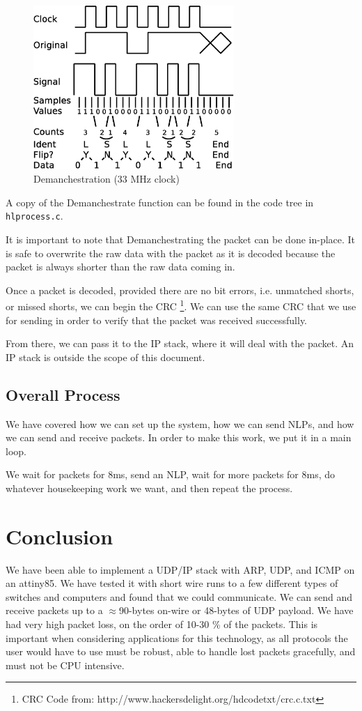 \documentclass[13pt]{ltxdoc}
\begin{document}
\begin{figure}
    \label{demanchester}
    \centering
    \includegraphics[width=3.0in]{demanchester}
    \caption{Demanchestration (33 MHz clock)}
\end{figure}

A copy of the Demanchestrate function can be found in the code tree in \texttt{hlprocess.c}.

It is important to note that Demanchestrating the packet can be done in-place.  It is
safe to overwrite the raw data with the packet as it is decoded because the packet is always shorter
than the raw data coming in.

Once a packet is decoded, provided there are no bit errors, i.e. unmatched shorts, or missed
shorts, we can begin the CRC \footnote{CRC Code from: http://www.hackersdelight.org/hdcodetxt/crc.c.txt}.  We can use the same CRC that we use for sending in order to verify that the packet
was received successfully.

From there, we can pass it to the IP stack, where it will deal with the packet.  An IP 
stack is outside the scope of this document.

\subsection{Overall Process}
We have covered how we can set up the system, how we can send NLPs, and how we can send and receive
packets. In order to make this work, we put it in a main loop.

We wait for packets for 8ms, send an NLP, wait for more packets for 8ms, do whatever housekeeping work we want, and then repeat the process.

\section{Conclusion}
We have been able to implement a UDP/IP stack with ARP, UDP, and ICMP on an attiny85.  We have tested it
with short wire runs to a few different types of switches and computers and found that we could communicate.
We can send and receive packets up to a $\approx$90-bytes on-wire or 48-bytes of UDP payload.
We have had very high packet loss, on the order of 10-30 \% of the packets.  This is important
when considering applications for this technology, as all protocols the user would have to use must be
robust, able to handle lost packets gracefully, and must not be CPU intensive.
\end{document}
